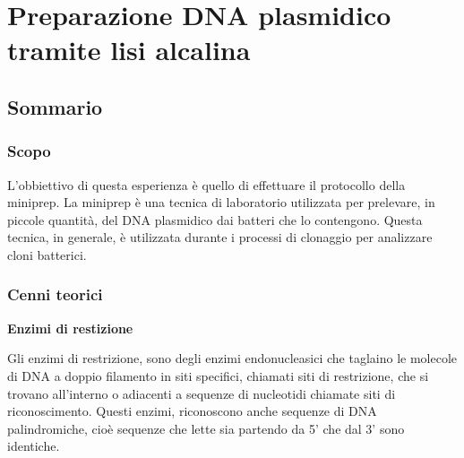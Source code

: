 \section{\LARGE{Preparazione DNA plasmidico tramite lisi alcalina}}

\vspace{0.6cm}


\subsection{Sommario}

\subsubsection{Scopo}

L'obbiettivo di questa esperienza è quello di effettuare il protocollo della miniprep.
La miniprep è una tecnica di laboratorio utilizzata per prelevare, in piccole quantità,
del DNA plasmidico dai batteri che lo contengono. Questa tecnica, in generale, è utilizzata
durante i processi di clonaggio per analizzare cloni batterici.

\subsubsection{Cenni teorici}



\textbf{Enzimi di restizione}
\vspace{0.3cm}



Gli enzimi di restrizione, sono degli enzimi endonucleasici che taglaino le molecole di DNA a doppio filamento in siti specifici, chiamati siti di restrizione, che si trovano all'interno o adiacenti a sequenze di nucleotidi chiamate siti di riconoscimento.
Questi enzimi, riconoscono anche sequenze di DNA palindromiche, cioè sequenze che lette sia partendo da 5' che dal 3' sono identiche.

